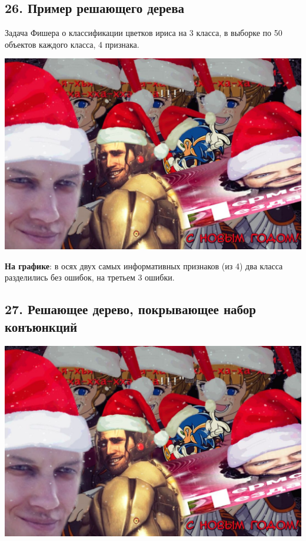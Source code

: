 \subsection{26. Пример решающего дерева}

Задача Фишера о классификации цветков ириса на 3 класса, в выборке по 50
объектов каждого класса, 4 признака.

\includegraphics[scale=0.3]{figures/samplefigure.jpg}

\textbf{На графике}: в осях двух самых информативных признаков (из 4) два класса
разделились без ошибок, на третьем 3 ошибки.

\subsection{27. Решающее дерево, покрывающее набор конъюнкций}

\includegraphics[scale=0.3]{figures/samplefigure.jpg}


